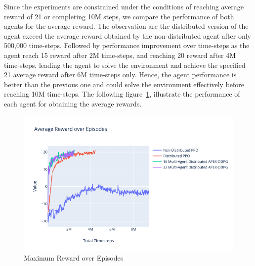 Since the experiments are constrained under the conditions of reaching average reward of 21 or completing 10M steps, we compare the performance of both agents for the average reward. The observation are the distributed version of the agent exceed the average reward obtained by the non-distributed agent after only 500,000 time-steps. Followed by performance improvement over time-steps as the agent reach 15 reward after 2M time-steps, and reaching 20 reward after 4M time-steps, leading the agent to solve the environment and achieve the specified 21 average reward after 6M time-steps only. Hence, the agent performance is better than the previous one and could solve the environment effectively before reaching 10M time-steps. The following figure~\ref{fig:3rd_exp_avg_eps_reward}, illustrate the performance of each agent for obtaining the average rewards.
\begin{figure}[!htb]
		\centering
		\includegraphics[width=\linewidth]{figures/exps/3rd_exp/avg_eps_reward.png}
		\caption{Maximum Reward over Episodes}
		\label{fig:3rd_exp_avg_eps_reward}
\end{figure}

